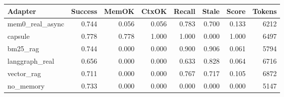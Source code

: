 \begin{tabular}{lrrrrrrr}
\hline
Adapter & Success & MemOK & CtxOK & Recall & Stale & Score & Tokens \\
\hline
mem0\_real\_async & 0.744 & 0.056 & 0.056 & 0.783 & 0.700 & 0.133 & 6212 \\
capsule & 0.778 & 0.778 & 1.000 & 1.000 & 0.000 & 1.000 & 6497 \\
bm25\_rag & 0.744 & 0.000 & 0.000 & 0.900 & 0.906 & 0.061 & 5794 \\
langgraph\_real & 0.656 & 0.000 & 0.000 & 0.633 & 0.828 & 0.064 & 6716 \\
vector\_rag & 0.711 & 0.000 & 0.000 & 0.767 & 0.717 & 0.105 & 6872 \\
no\_memory & 0.733 & 0.000 & 0.000 & 0.000 & 0.000 & 0.000 & 5147 \\
\hline
\end{tabular}
